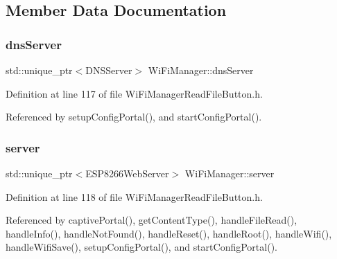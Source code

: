 \subsection{Member Data Documentation}
\mbox{\label{class_wi_fi_manager_af44ccd00daee619a7bcc89000fa063ca}} 
\subsubsection{\texorpdfstring{dns\+Server}{dnsServer}}
{\footnotesize\ttfamily std\+::unique\+\_\+ptr$<$D\+N\+S\+Server$>$ Wi\+Fi\+Manager\+::dns\+Server\hspace{0.3cm}{\ttfamily [private]}}



Definition at line 117 of file Wi\+Fi\+Manager\+Read\+File\+Button.\+h.



Referenced by setup\+Config\+Portal(), and start\+Config\+Portal().

\mbox{\label{class_wi_fi_manager_a509523a01c0395cf0dc235b074f2a5ea}} 
\subsubsection{\texorpdfstring{server}{server}}
{\footnotesize\ttfamily std\+::unique\+\_\+ptr$<$E\+S\+P8266\+Web\+Server$>$ Wi\+Fi\+Manager\+::server\hspace{0.3cm}{\ttfamily [private]}}



Definition at line 118 of file Wi\+Fi\+Manager\+Read\+File\+Button.\+h.



Referenced by captive\+Portal(), get\+Content\+Type(), handle\+File\+Read(), handle\+Info(), handle\+Not\+Found(), handle\+Reset(), handle\+Root(), handle\+Wifi(), handle\+Wifi\+Save(), setup\+Config\+Portal(), and start\+Config\+Portal().

\mbox{\label{class_wi_fi_manager_a2c27e2f375122254cde4b2fd9ed1e117}} 
